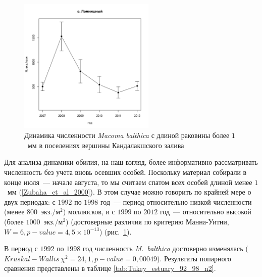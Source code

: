 \begin{figure}[p]
\begin{minipage}[b]{.46\linewidth}
\begin{center}
	\end{center}
	\end{minipage}
%
	\hfil %
%
	\begin{minipage}[b]{.46\linewidth}
	\begin{center}
		\includegraphics[width=65mm]{../White_Sea/Lomnishniy/N2_dynamic1.pdf}
	\end{center}
	\end{minipage}



	\caption{Динамика численности {\it Macoma balthica} с длиной раковины более $1$~мм в поселениях вершины Кандалакшского залива}
	\label{ris:dynamic_Kandalaksha_all2}
	\end{figure}



Для анализа динамики обилия, на наш взгляд, более информативно рассматривать численность без учета вновь осевших особей. 
Поскольку материал собирали в конце июля~--- начале августа, то мы считаем спатом всех особей длиной менее $1$~мм (\ref{Zubaha_et_al_2000}).
В этом случае можно говорить по крайней мере о двух периодах: с $1992$ по $1998$ год~--- период относительно низкой численности (менее $800$~экз./м$^2$) моллюсков, и с $1999$ по $2012$ год~--- относительно высокой (более $1000$~экз./м$^2$) (достоверные различия по критерию Манна-Уитни, $W = 6, p-value = 4,5 \times 10^{-13}$) (рис.~\ref{ris:dynamic_Kandalaksha_all2}).

В период с $1992$ по $1998$ год численность {\it M.~balthica} достоверно изменялась ($Kruskal-Wallis\ \chi^2 = 24,1, p-value = 0,00049$). Результаты попарного сравнения представлены в таблице \ref{tab:Tukey_estuary_92_98_n2}.

